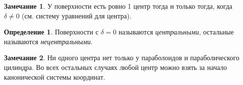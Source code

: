 \documentclass[a4paper, 12pt]{article}
\theoremstyle{definition}
\newtheorem*{definition}{Определение}
\newtheorem*{remark}{Замечание}
\begin{document}
\begin{remark}
    У поверхности есть ровно 1 центр тогда и только тогда, когда $\delta \neq 0$ (см. систему уравнений для центра).
\end{remark}

\begin{definition}
    Поверхности с $\delta = 0$ называются \textit{центральными}, остальные называются \textit{нецентральными}.
\end{definition}

\begin{remark}
    Ни одного центра нет только у параболоидов и параболического цилиндра. Во всех остальных случаях любой центр можно взять за начало канонической системы координат.
\end{remark}
\end{document}
